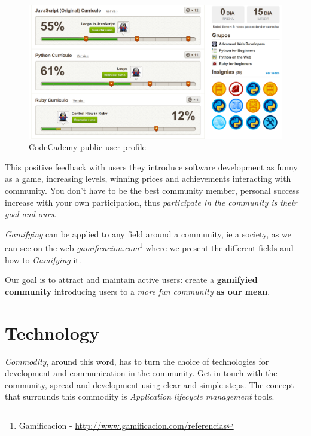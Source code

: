 \documentclass[11pt]{scrartcl}
\begin{document}
\begin{figure}[H]
    \centering
    \includegraphics[width=1\textwidth]{codecademy-gamifying.png}
    \caption{CodeCademy public user profile}
    \label{codecademy-profile}
\end{figure}

\par This positive feedback with users they introduce software development as funny as a game, increasing levels, winning prices and achievements interacting with community. You don't have to be the best community member, personal success increase with your own participation, thus \emph{participate in the community is their goal and ours}.

\par \emph{Gamifying} can be applied to any field around a community, ie a society, as we can see on the web \emph{gamificacion.com}\footnote{Gamificacion - \url{http://www.gamificacion.com/referencias}} where we present the different fields and how to \emph{Gamifying} it.

\par Our goal is to attract and maintain active users: create a \textbf{gamifyied community} introducing users to a \emph{more fun community} \textbf{as our mean}.


\section{Technology}
\label{sec:technology}

\par \emph{Commodity}, around this word, has to turn the choice of technologies for development and communication in the community. Get in touch with the community, spread and development using clear and simple steps. The concept that surrounds this commodity is \emph{Application lifecycle management} tools.
\end{document}
